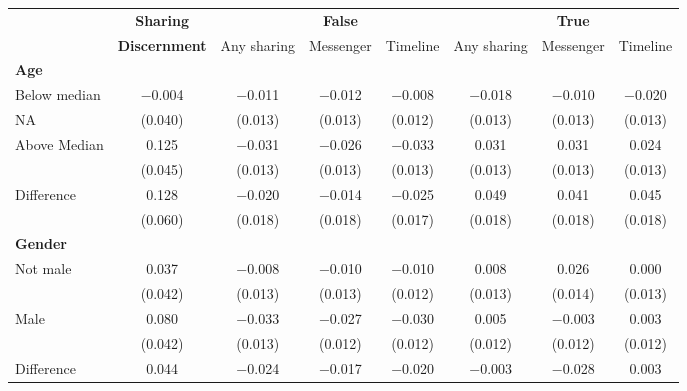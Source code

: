 
\begin{tabular}[t]{lccccccc}
 & \textbf{Sharing} &  & \textbf{False} &  &  & \textbf{True} & \\
 & \textbf{Discernment} & Any sharing & Messenger & Timeline & Any sharing & Messenger & Timeline\\\cmidrule(lr){2-2} \cmidrule(lr){3-5} \cmidrule(lr){6-8} \multicolumn{4}{l}{\textbf{Age}} \rule{0pt}{1.2\normalbaselineskip}\\
\hspace{1em} Below median & \num{-0.004} & \num{-0.011} & \num{-0.012} & \num{-0.008} & \num{-0.018} & \num{-0.010} & \num{-0.020}\\
\hspace{2em}NA & (\num{0.040}) & (\num{0.013}) & (\num{0.013}) & (\num{0.012}) & (\num{0.013}) & (\num{0.013}) & (\num{0.013})\\
\hspace{1em} Above Median & \num{0.125} & \num{-0.031} & \num{-0.026} & \num{-0.033} & \num{0.031} & \num{0.031} & \num{0.024}\\
\hspace{2em} & (\num{0.045}) & (\num{0.013}) & (\num{0.013}) & (\num{0.013}) & (\num{0.013}) & (\num{0.013}) & (\num{0.013})\\\cmidrule(lr){2-8}
\hspace{1em} Difference & \num{0.128} & \num{-0.020} & \num{-0.014} & \num{-0.025} & \num{0.049} & \num{0.041} & \num{0.045}\\
 & (\num{0.060}) & (\num{0.018}) & (\num{0.018}) & (\num{0.017}) & (\num{0.018}) & (\num{0.018}) & (\num{0.018})\\\multicolumn{4}{l}{\textbf{Gender}} \rule{0pt}{1.2\normalbaselineskip}\\
\hspace{1em} Not male & \num{0.037} & \num{-0.008} & \num{-0.010} & \num{-0.010} & \num{0.008} & \num{0.026} & \num{0.000}\\
 & (\num{0.042}) & (\num{0.013}) & (\num{0.013}) & (\num{0.012}) & (\num{0.013}) & (\num{0.014}) & (\num{0.013})\\
\hspace{1em} Male & \num{0.080} & \num{-0.033} & \num{-0.027} & \num{-0.030} & \num{0.005} & \num{-0.003} & \num{0.003}\\
 & (\num{0.042}) & (\num{0.013}) & (\num{0.012}) & (\num{0.012}) & (\num{0.012}) & (\num{0.012}) & (\num{0.012})\\\cmidrule(lr){2-8}
\hspace{1em} Difference & \num{0.044} & \num{-0.024} & \num{-0.017} & \num{-0.020} & \num{-0.003} & \num{-0.028} & \num{0.003}\\

\end{tabular}
